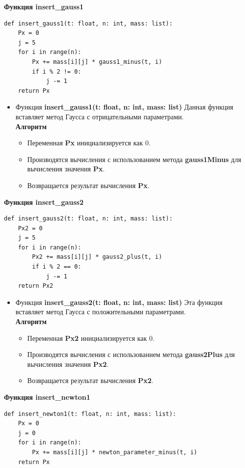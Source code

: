\documentclass{article}
\begin{document}
\textbf{\large{Функция insert\_gauss1}}
\begin{lstlisting}
def insert_gauss1(t: float, n: int, mass: list):
    Px = 0
    j = 5
    for i in range(n):
        Px += mass[i][j] * gauss1_minus(t, i)
        if i % 2 != 0:
            j -= 1
    return Px
\end{lstlisting}

\begin{itemize}
\item Функция \textbf{insert\_gauss1(t: float, n: int, mass: list)} 
Данная функция вставляет метод Гаусса с отрицательными параметрами.\\
\textbf{Алгоритм}
\begin{itemize}
    \item Переменная \textbf{Px} инициализируется как 0.
    \item Производятся вычисления с использованием метода \textbf{gauss1Minus} для вычисления значения \textbf{Px}.
    \item Возвращается результат вычисления \textbf{Px}.

\end{itemize}
\end{itemize}


\textbf{\large{Функция insert\_gauss2}}
\begin{lstlisting}
def insert_gauss2(t: float, n: int, mass: list):
    Px2 = 0
    j = 5
    for i in range(n):
        Px2 += mass[i][j] * gauss2_plus(t, i)
        if i % 2 == 0:
            j -= 1
    return Px2
\end{lstlisting}

\begin{itemize}
\item Функция \textbf{insert\_gauss2(t: float, n: int, mass: list)} 
Эта функция вставляет метод Гаусса с положительными параметрами.\\
\textbf{Алгоритм}
\begin{itemize}
    \item Переменная \textbf{Px2} инициализируется как 0.
    \item Производятся вычисления с использованием метода \textbf{gauss2Plus} для вычисления значения \textbf{Px2}.
    \item Возвращается результат вычисления \textbf{Px2}.

\end{itemize}
\end{itemize}

\textbf{\large{Функция insert\_newton1}}
\begin{lstlisting}
def insert_newton1(t: float, n: int, mass: list):
    Px = 0
    j = 0
    for i in range(n):
        Px += mass[i][j] * newton_parameter_minus(t, i)
    return Px
\end{lstlisting}
\end{document}

